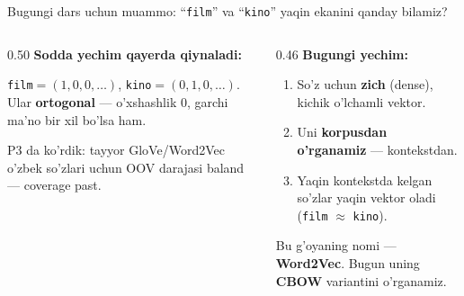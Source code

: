 \documentclass[aspectratio=169,11pt]{beamer}
\begin{document}
\begin{frame}{Bugungi dars uchun muammo: ``\texttt{film}'' va ``\texttt{kino}'' yaqin ekanini qanday bilamiz?}
  \begin{columns}[T]
    \begin{column}{0.50\textwidth}
      \textbf{Sodda yechim qayerda qiynaladi:}\\[3pt]
      \small
      \begin{tcolorbox}[warnbox,title={1. One-hot: har so'z alohida o'q},top=2pt,bottom=2pt]
        \footnotesize
        \texttt{film}$=(1,0,0,\ldots)$, \texttt{kino}$=(0,1,0,\ldots)$.
        Ular \textbf{ortogonal} --- o'xshashlik $0$, garchi ma'no bir xil bo'lsa ham.
      \end{tcolorbox}
      \vspace{3pt}
      \begin{tcolorbox}[warnbox,title={2. Pretrained (L3) o'zbek uchun siyrak},top=2pt,bottom=2pt]
        \footnotesize
        P3 da ko'rdik: tayyor GloVe/Word2Vec o'zbek so'zlari uchun OOV darajasi
        baland --- coverage past.
      \end{tcolorbox}
    \end{column}
    \begin{column}{0.46\textwidth}
      \textbf{Bugungi yechim:}\\[4pt]
      \small
      \begin{enumerate}\setlength\itemsep{4pt}
        \item So'z uchun \textbf{zich} (dense), kichik o'lchamli vektor.
        \item Uni \textbf{korpusdan o'rganamiz} --- kontekstdan.
        \item Yaqin kontekstda kelgan so'zlar yaqin vektor oladi
              (\texttt{film} $\approx$ \texttt{kino}).
      \end{enumerate}
      \vspace{5pt}
      \begin{tcolorbox}[okbox,top=2pt,bottom=2pt]
        \footnotesize
        Bu g'oyaning nomi --- \textbf{Word2Vec}. Bugun uning \textbf{CBOW}
        variantini o'rganamiz.
      \end{tcolorbox}
    \end{column}
  \end{columns}
\end{frame}
\end{document}
